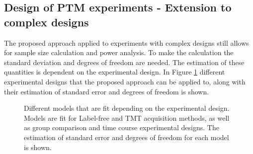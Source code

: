 \documentclass{mcp}
\begin{document}

\subsection{Design of PTM experiments - Extension to complex designs}
\label{sec:complex_design}

The proposed approach applied to experiments with complex designs still allows for sample size calculation and power analysis. To make the calculation the standard deviation and degrees of freedom are needed. The estimation of these quantities is dependent on the experimental design. In Figure \ref{fig:statistical_inference} different experimental designs that the proposed approach can be applied to, along with their estimation of standard error and degrees of freedom is shown.

\begin{figure}[h!]
%
\caption{Different models that are fit depending on the experimental design. Models are fit for Label-free and TMT acquisition methods, as well as group comparison and time course experimental designs. The estimation of standard error and degrees of freedom for each model is shown. \label{fig:statistical_inference}}
\end{figure}
\end{document}
